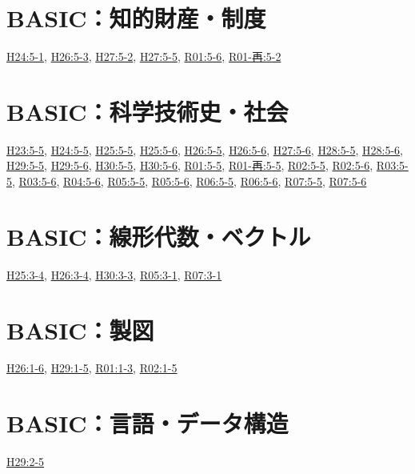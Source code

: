 \section{BASIC：知的財産・制度}
\hyperref[q:h24-reg-basic-5-1]{H24:5-1}, \hyperref[q:h26-reg-basic-5-3]{H26:5-3}, \hyperref[q:h27-reg-basic-5-2]{H27:5-2}, \hyperref[q:h27-reg-basic-5-5]{H27:5-5}, \hyperref[q:r01-reg-basic-5-6]{R01:5-6}, \hyperref[q:r01-ret-basic-5-2]{R01-再:5-2}
\section{BASIC：科学技術史・社会}
\hyperref[q:h23-reg-basic-5-5]{H23:5-5}, \hyperref[q:h24-reg-basic-5-5]{H24:5-5}, \hyperref[q:h25-reg-basic-5-5]{H25:5-5}, \hyperref[q:h25-reg-basic-5-6]{H25:5-6}, \hyperref[q:h26-reg-basic-5-5]{H26:5-5}, \hyperref[q:h26-reg-basic-5-6]{H26:5-6}, \hyperref[q:h27-reg-basic-5-6]{H27:5-6}, \hyperref[q:h28-reg-basic-5-5]{H28:5-5}, \hyperref[q:h28-reg-basic-5-6]{H28:5-6}, \hyperref[q:h29-reg-basic-5-5]{H29:5-5}, \hyperref[q:h29-reg-basic-5-6]{H29:5-6}, \hyperref[q:h30-reg-basic-5-5]{H30:5-5}, \hyperref[q:h30-reg-basic-5-6]{H30:5-6}, \hyperref[q:r01-reg-basic-5-5]{R01:5-5}, \hyperref[q:r01-ret-basic-5-5]{R01-再:5-5}, \hyperref[q:r02-reg-basic-5-5]{R02:5-5}, \hyperref[q:r02-reg-basic-5-6]{R02:5-6}, \hyperref[q:r03-reg-basic-5-5]{R03:5-5}, \hyperref[q:r03-reg-basic-5-6]{R03:5-6}, \hyperref[q:r04-reg-basic-5-6]{R04:5-6}, \hyperref[q:r05-reg-basic-5-5]{R05:5-5}, \hyperref[q:r05-reg-basic-5-6]{R05:5-6}, \hyperref[q:r06-reg-basic-5-5]{R06:5-5}, \hyperref[q:r06-reg-basic-5-6]{R06:5-6}, \hyperref[q:r07-reg-basic-5-5]{R07:5-5}, \hyperref[q:r07-reg-basic-5-6]{R07:5-6}
\section{BASIC：線形代数・ベクトル}
\hyperref[q:h25-reg-basic-3-4]{H25:3-4}, \hyperref[q:h26-reg-basic-3-4]{H26:3-4}, \hyperref[q:h30-reg-basic-3-3]{H30:3-3}, \hyperref[q:r05-reg-basic-3-1]{R05:3-1}, \hyperref[q:r07-reg-basic-3-1]{R07:3-1}
\section{BASIC：製図}
\hyperref[q:h26-reg-basic-1-6]{H26:1-6}, \hyperref[q:h29-reg-basic-1-5]{H29:1-5}, \hyperref[q:r01-reg-basic-1-3]{R01:1-3}, \hyperref[q:r02-reg-basic-1-5]{R02:1-5}
\section{BASIC：言語・データ構造}
\hyperref[q:h29-reg-basic-2-5]{H29:2-5}
